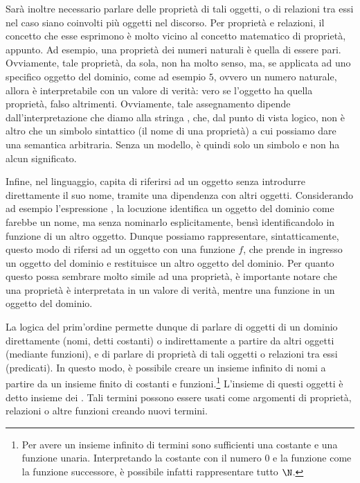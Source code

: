 Sarà inoltre necessario parlare delle proprietà di tali oggetti, o di relazioni tra essi nel caso siano coinvolti più oggetti nel discorso. Per proprietà e relazioni, il concetto che esse esprimono è molto vicino al concetto matematico di proprietà, appunto. Ad esempio, una proprietà dei numeri naturali è quella di essere pari. Ovviamente, tale proprietà, da sola, non ha molto senso, ma, se applicata ad uno specifico oggetto del dominio, come ad esempio \(5\), ovvero un numero naturale, allora è interpretabile con un valore di verità: vero se l'oggetto ha quella proprietà, falso altrimenti. Ovviamente, tale assegnamento dipende dall'interpretazione che diamo alla stringa , che, dal punto di vista logico, non è altro che un simbolo sintattico (il nome di una proprietà) a cui possiamo dare una semantica arbitraria. Senza un modello,  è quindi solo un simbolo e non ha alcun significato.

Infine, nel linguaggio, capita di riferirsi ad un oggetto senza introdurre direttamente il suo nome, tramite una dipendenza con altri oggetti. Considerando ad esempio l'espressione , la locuzione  identifica un oggetto del dominio come farebbe un nome, ma senza nominarlo esplicitamente, bensì identificandolo in funzione di un altro oggetto. Dunque possiamo rappresentare, sintatticamente, questo modo di rifersi ad un oggetto con una funzione \(f\), che prende in ingresso un oggetto del dominio e restituisce un altro oggetto del dominio. Per quanto questo possa sembrare molto simile ad una proprietà, è importante notare che una proprietà è interpretata in un valore di verità, mentre una funzione in un oggetto del dominio. 

La logica del prim'ordine permette dunque di parlare di oggetti di un dominio direttamente (nomi, detti costanti) o indirettamente a partire da altri oggetti (mediante funzioni), e di parlare di proprietà di tali oggetti o relazioni tra essi (predicati). In questo modo, è possibile creare un insieme infinito di nomi a partire da un insieme finito di costanti e funzioni.\footnote{Per avere un insieme infinito di termini sono sufficienti una costante e una funzione unaria. Interpretando la costante con il numero \(0\) e la funzione come la funzione successore, è possibile infatti rappresentare tutto \(\N\).} L'insieme di questi oggetti è detto insieme dei . Tali termini possono essere usati come argomenti di proprietà, relazioni o altre funzioni creando nuovi termini.

